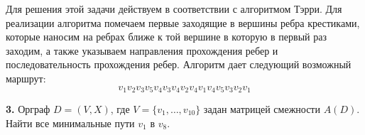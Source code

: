 \documentclass[12pt, letterpaper, titlepage]{article}
\begin{document}
Для решения этой задачи действуем в соответствии с алгоритмом Тэрри.
Для реализации алгоритма помечаем первые заходящие в вершины ребра крестиками, которые наносим на
ребрах ближе к той вершине в которую в первый
раз заходим, а также указываем направления прохождения ребер и последовательность
прохождения ребер. Алгоритм дает следующий возможный маршрут:
\begin{equation*}
    v_1v_2v_3v_5v_4v_3v_4v_2v_4v_1v_4v_5v_3v_2v_1
\end{equation*}
\begin{center}\end{center}
\iffalse
    \textbf{3.} Используя алгоритм “фронта волны”, найти все минимальные пути из первой вершины в
    последнюю орграфа, заданного матрицей смежности
    \begin{equation*}
        A =
        \begin{pmatrix}
            0 & 0 & 1 & 0 & 0 & 1 & 0 & 0 \\
            1 & 0 & 1 & 1 & 1 & 1 & 0 & 0 \\
            1 & 0 & 0 & 0 & 0 & 1 & 0 & 0 \\
            1 & 1 & 1 & 0 & 0 & 1 & 0 & 0 \\
            1 & 1 & 1 & 1 & 0 & 0 & 1 & 1 \\
            0 & 0 & 1 & 1 & 0 & 0 & 0 & 0 \\
            1 & 0 & 1 & 1 & 1 & 1 & 1 & 0 \\
            1 & 0 & 1 & 1 & 0 & 0 & 1 & 0 \\
        \end{pmatrix}.
    \end{equation*}
\fi
\textbf{3.} Орграф $D=(V,X)$, где $V = \{v_1, \dots, v_{10}\}$ задан матрицей
смежности $A(D)$. Найти все минимальные пути $v_1$ в $v_{8}$.
\end{document}
